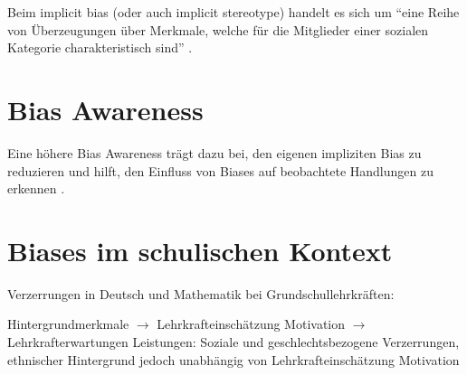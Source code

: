 
Beim implicit bias (oder auch implicit stereotype) handelt es sich um ``eine Reihe von Überzeugungen über Merkmale, welche für die Mitglieder einer sozialen Kategorie charakteristisch sind'' \citep[Übers. d. Verf.]{greenwald1995implicit}.

\section{Bias Awareness}

Eine höhere Bias Awareness trägt dazu bei, den eigenen impliziten Bias zu reduzieren \citep{pope2018awareness} und hilft, den Einfluss von Biases auf beobachtete Handlungen zu erkennen \citep{perry2015modern}.

\section{Biases im schulischen Kontext}

Verzerrungen in Deutsch und Mathematik bei Grundschullehrkräften: \cite{lorenz2016stereotype}

Hintergrundmerkmale $\rightarrow$ Lehrkrafteinschätzung Motivation $\rightarrow$ Lehrkrafterwartungen Leistungen: Soziale und geschlechtsbezogene Verzerrungen, ethnischer Hintergrund jedoch unabhängig von Lehrkrafteinschätzung Motivation \cite{gentrup2020einschatzungen}